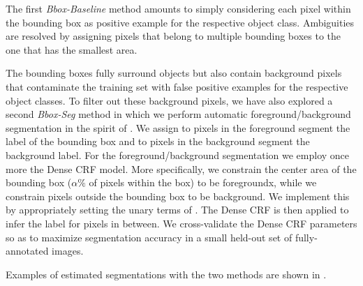 The first \textsl{Bbox-Baseline} method amounts to simply considering
each pixel within the bounding box as positive example for the
respective object class. Ambiguities are resolved by assigning pixels
that belong to multiple bounding boxes to the one that has the
smallest area.

The bounding boxes fully surround objects but also contain background
pixels that contaminate the training set with false positive examples
for the respective object classes. To filter out these background
pixels, we have also explored a second \textsl{Bbox-Seg} method in
which we perform automatic foreground/background segmentation in the
spirit of \citet{rother2004grabcut}. We assign to pixels in the
foreground segment the label of the bounding box and to pixels in the
background segment the background label. For the foreground/background
segmentation we employ once more the Dense CRF model. More
specifically, we constrain the center area of the bounding box
($\alpha\%$ of pixels within the box) to be foregroundx, while we
constrain pixels outside the bounding box to be background. We
implement this by appropriately setting the unary terms of
. The Dense CRF is then applied to infer the
label for pixels in between. We cross-validate the Dense CRF
parameters so as to maximize segmentation accuracy in a small held-out
set of fully-annotated images.

Examples of estimated segmentations with the two methods are
shown in .

